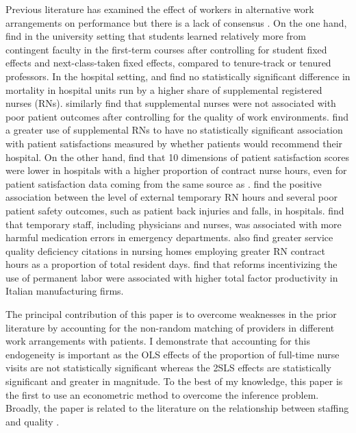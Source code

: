 \documentclass[final,12pt]{article}
\begin{document}
Previous literature has examined the effect of workers in alternative work arrangements on performance but there is a lack of consensus \citep{Bae2010, Xue2012, Lotti2012, Aiken2013, Figlio2015, Lasater2015, Hockenberry2016, Lu2016}.   %
On the one hand,
\citet{Figlio2015} find in the university setting that students learned relatively more from contingent faculty in the first-term courses after controlling for student fixed effects and next-class-taken fixed effects, compared to tenure-track or tenured professors.
In the hospital setting, %
\citet{Xue2012} and \citet{Aiken2013} find no statistically significant difference in mortality in hospital units run by a higher share of supplemental registered nurses (RNs). \citet{Aiken2007} similarly find that supplemental nurses were not associated with poor patient outcomes after controlling for the quality of work environments.
\citet{Lasater2015} find a greater use of supplemental RNs to have no statistically significant association with patient satisfactions measured by whether patients would recommend their hospital.
On the other hand, \citet{Hockenberry2016} find that 10 dimensions of patient satisfaction scores were lower in hospitals with a higher proportion of contract nurse hours, even for patient satisfaction data coming from the same source as \citet{Lasater2015}.
\citet{Bae2010} find the positive association between the level of external temporary RN hours and several poor patient safety outcomes, such as patient back injuries and falls, in hospitals.
\citet{Pham2011} find that temporary staff, including physicians and nurses, was associated with more harmful medication errors in emergency departments.
\citet{Lu2016} also find greater service quality deficiency citations in nursing homes employing greater RN contract hours as a proportion of total resident days.
\citet{Lotti2012} find that reforms incentivizing the use of permanent labor were associated with higher total factor productivity in Italian manufacturing firms.



The principal contribution of this paper is to overcome weaknesses in the prior literature by accounting for the non-random matching of providers in different work arrangements with patients.
I demonstrate that accounting for this endogeneity is important as the OLS effects of the proportion of full-time nurse visits are not statistically significant whereas the 2SLS effects are statistically significant and greater in magnitude.
To the best of my knowledge, this paper is the first to use an econometric method to overcome the inference problem.
Broadly, the paper is related to the literature on the relationship between staffing and quality \citep{Needleman2011, Tong2011, Cook2012, Mark2013, Lin2014, Matsudaira2014}.
\end{document}
